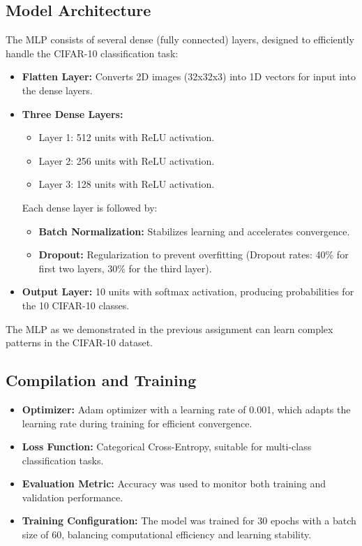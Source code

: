 \documentclass[lettersize,journal]{IEEEtran}
\begin{document}
\subsection{\textbf{Model Architecture}}
The MLP consists of several dense (fully connected) layers, designed to efficiently handle the CIFAR-10 classification task:
\begin{itemize}
    \item \textbf{Flatten Layer:} Converts 2D images (32x32x3) into 1D vectors for input into the dense layers.
    \item \textbf{Three Dense Layers:}
    \begin{itemize}
        \item Layer 1: 512 units with ReLU activation.
        \item Layer 2: 256 units with ReLU activation.
        \item Layer 3: 128 units with ReLU activation.
    \end{itemize}
    Each dense layer is followed by:
    \begin{itemize}
        \item \textbf{Batch Normalization:} Stabilizes learning and accelerates convergence.
        \item \textbf{Dropout:} Regularization to prevent overfitting (Dropout rates: 40\% for first two layers, 30\% for the third layer).
    \end{itemize}
    \item \textbf{Output Layer:} 10 units with softmax activation, producing probabilities for the 10 CIFAR-10 classes.
\end{itemize}

The MLP as we demonstrated in the previous assignment can learn complex patterns in the CIFAR-10 dataset.

\subsection{\textbf{Compilation and Training}}
\begin{itemize}
    \item \textbf{Optimizer:} Adam optimizer with a learning rate of 0.001, which adapts the learning rate during training for efficient convergence.
    \item \textbf{Loss Function:} Categorical Cross-Entropy, suitable for multi-class classification tasks.
    \item \textbf{Evaluation Metric:} Accuracy was used to monitor both training and validation performance.
    \item \textbf{Training Configuration:} The model was trained for 30 epochs with a batch size of 60, balancing computational efficiency and learning stability.
\end{itemize}
\end{document}
